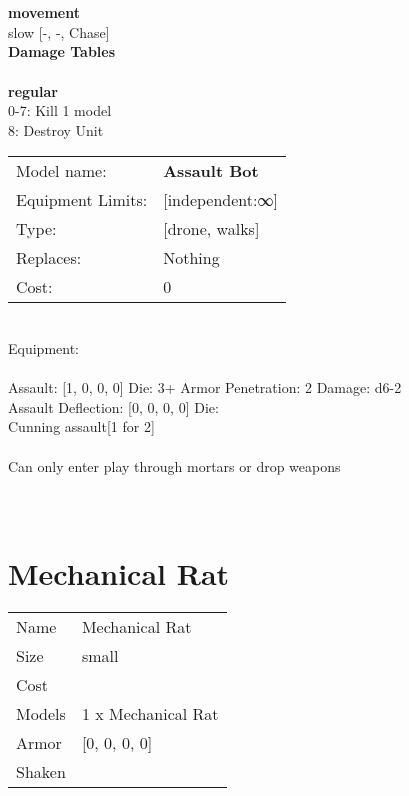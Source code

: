 \noindent \\ 


\ \\ {\bf movement } \\
slow [-, -, Chase] \\


{\bf Damage Tables} \\
\ \\ {\bf regular } \\
0-7: Kill 1 model \\
8: Destroy Unit \\


\noindent
\begin{tabular}{ll}
Model name: &{\bf Assault Bot } \\
Equipment Limits: &[independent:∞] \\
Type: &[drone, walks] \\
Replaces: &Nothing \\
Cost: & 0\\
\end{tabular}
\ \\
Equipment:  \\
\ \\
Assault: [1, 0, 0, 0] Die: 3+ Armor Penetration: 2 Damage: d6-2 \\
Assault Deflection: [0, 0, 0, 0] Die: \\
\indent Cunning assault[1 for 2]\\ 
 
\ \\
Can only enter play through mortars or drop weapons\\ 

\ \\
 
\ \\













\clearpage

\section{ Mechanical Rat }

\begin{tabular}{ll}
  Name & Mechanical Rat \\
  Size & small\\
  Cost & \\
  Models & 1 x Mechanical Rat\\
  Armor & [0, 0, 0, 0]\\
  Shaken & \\
\end{tabular}

